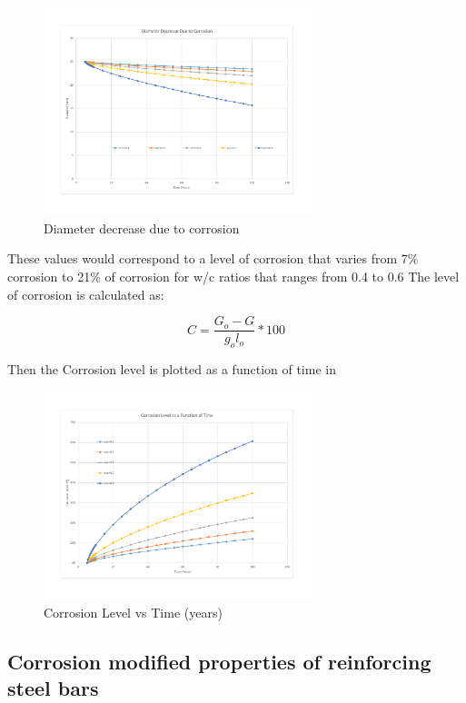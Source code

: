 \begin{figure}[htbp]
\centering
\includegraphics[width=0.7\textwidth]{Chapter-1/figs/DiameterDecrease}
\caption{Diameter decrease due to corrosion}
\label{fig:hist2}
\end{figure}

These values would correspond to a level of corrosion that varies from 7\% corrosion to 21\% of corrosion for w/c ratios that ranges from 0.4 to 0.6
The level of corrosion is calculated as:

\begin{equation}
  C=\frac{G_o-G}{g_ol_o} *100%
  \label{eq.seven}
\end{equation} 

Then the Corrosion level is plotted as a function of time in 

\begin{figure}[htbp]
\centering
\includegraphics[width=0.7\textwidth]{Chapter-1/figs/CorrosionLevel}
\caption{Corrosion Level vs Time (years)}
\label{fig:hist3}
\end{figure}

\subsection{Corrosion modified properties of reinforcing steel bars}

